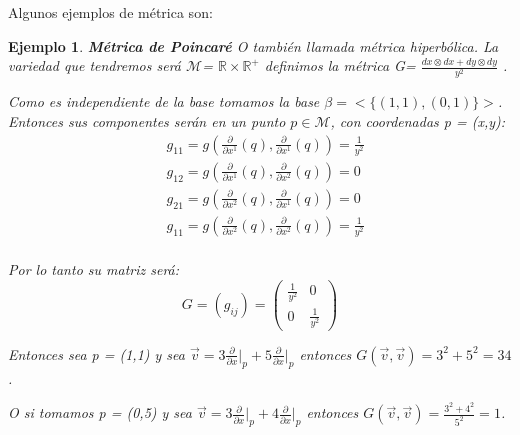 \documentclass[pdftex,11pt,a4paper]{book}
\newtheorem{ejem}{Ejemplo}
\newcommand{\M}{$\mathscr{M}$}
\begin{document}
Algunos ejemplos de métrica son: 
\begin{ejem}
\textbf{Métrica de Poincaré} O también llamada métrica hiperbólica. La variedad que tendremos será  \M = $\mathds{R} \times \mathds{R}^+ $ definimos la métrica 
G= $\frac{dx \otimes dx + dy \otimes dy}{y^2}$ . 


Como es independiente de la base tomamos la base $\beta = <\{(1,1),(0,1)\}> $. Entonces sus componentes  serán en un punto $p \in$\M, con coordenadas p = (x,y): 
\begin{equation}
    \begin{aligned}
           &g_{11}= g(\frac{\partial}{\partial x^1}(q), \frac{\partial}{\partial x^1}(q)) = \frac{1}{y^2}  \\
           & g_{12} =  g(\frac{\partial}{\partial x^1}(q), \frac{\partial}{\partial x^2}(q)) = 0 \\
           & g_{21} =  g(\frac{\partial}{\partial x^2}(q), \frac{\partial}{\partial x^1}(q)) = 0 \\
           & g_{11}= g(\frac{\partial}{\partial x^2}(q), \frac{\partial}{\partial x^2}(q)) = \frac{1}{y^2} \\
    \end{aligned}
\end{equation}

    
Por lo tanto su matriz será: 
\begin{equation}
G=\left(g_{i j}\right)=\left(\begin{array}{cc}
\frac{1}{y^{2}} & 0 \\
0 & \frac{1}{y^{2}}
\end{array}\right)
\end{equation}

Entonces sea  p = (1,1) y sea $\vec{v}= 3\frac{\partial}{\partial x}\bigg|_p + 5 \frac{\partial}{\partial x}\bigg|_p  $ entonces $G(\vec{v}, \vec{v})= 3^2 +5^2 = 34$. 

O si tomamos p = (0,5) y sea  $\vec{v}= 3\frac{\partial}{\partial x}\bigg|_p + 4 \frac{\partial}{\partial x}\bigg|_p  $  entonces $G(\vec{v}, \vec{v})= \frac{3^2+ 4^2}{5^2} = 1$. 
\end{ejem}
\end{document}
